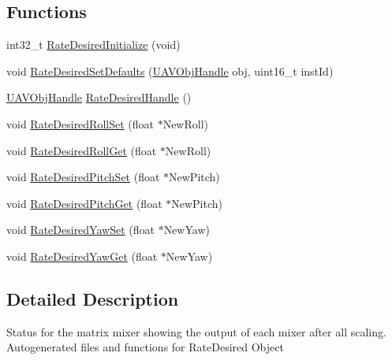 \subsection*{\-Functions}
\begin{DoxyCompactItemize}
\item 
int32\-\_\-t \hyperlink{group___rate_desired_gab1f59cffc8b23961699e68567a89c900}{\-Rate\-Desired\-Initialize} (void)
\item 
void \hyperlink{group___rate_desired_gab42dbc7124773c6b09815d4b03d8db6f}{\-Rate\-Desired\-Set\-Defaults} (\hyperlink{targets_2_u_a_v_objects_2inc_2uavobjectmanager_8h_a279053e22be53ce9f895043aaeb91e3b}{\-U\-A\-V\-Obj\-Handle} obj, uint16\-\_\-t inst\-Id)
\item 
\hyperlink{targets_2_u_a_v_objects_2inc_2uavobjectmanager_8h_a279053e22be53ce9f895043aaeb91e3b}{\-U\-A\-V\-Obj\-Handle} \hyperlink{group___rate_desired_ga6e17ac4e17baebd542d64467c2632870}{\-Rate\-Desired\-Handle} ()
\item 
void \hyperlink{group___rate_desired_gaf06e954a9579d8925cbd15ef0dbb75e3}{\-Rate\-Desired\-Roll\-Set} (float $\ast$\-New\-Roll)
\item 
void \hyperlink{group___rate_desired_ga000fa3765a3c0f52a12a51d62c7104e8}{\-Rate\-Desired\-Roll\-Get} (float $\ast$\-New\-Roll)
\item 
void \hyperlink{group___rate_desired_ga04c8a4a2decd8d5013d5213248599e67}{\-Rate\-Desired\-Pitch\-Set} (float $\ast$\-New\-Pitch)
\item 
void \hyperlink{group___rate_desired_ga4ee2dae27b1b5d4c5b315ba047e1b6b0}{\-Rate\-Desired\-Pitch\-Get} (float $\ast$\-New\-Pitch)
\item 
void \hyperlink{group___rate_desired_gae075000788f647efa72632883ee2a182}{\-Rate\-Desired\-Yaw\-Set} (float $\ast$\-New\-Yaw)
\item 
void \hyperlink{group___rate_desired_ga1a439fdd9d40d1fdbe516165e3014cf7}{\-Rate\-Desired\-Yaw\-Get} (float $\ast$\-New\-Yaw)
\end{DoxyCompactItemize}


\subsection{\-Detailed \-Description}
\-Status for the matrix mixer showing the output of each mixer after all scaling. \-Autogenerated files and functions for \-Rate\-Desired \-Object 

